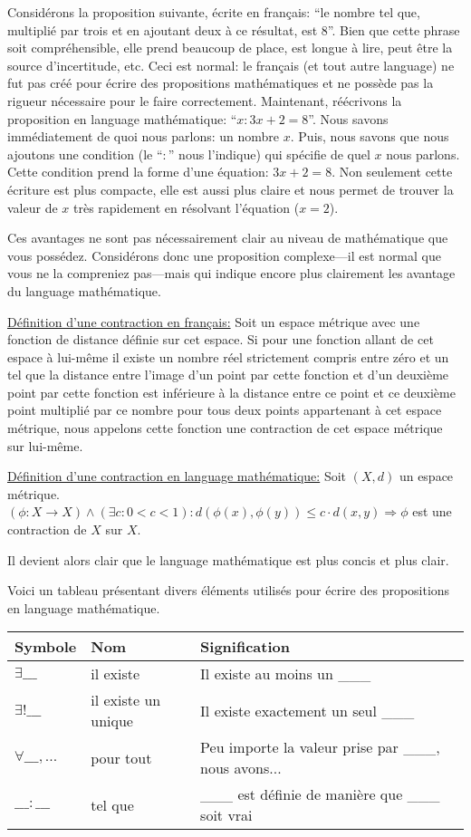 Considérons la proposition suivante, écrite en français: ``le nombre tel que, multiplié par trois et en ajoutant deux à ce résultat, est 8''. Bien que cette phrase soit compréhensible, elle prend beaucoup de place, est longue à lire, peut être la source d'incertitude, etc. Ceci est normal: le français (et tout autre language) ne fut pas créé pour écrire des propositions mathématiques et ne possède pas la rigueur nécessaire pour le faire correctement. Maintenant, réécrivons la proposition en language mathématique: ``$x : 3x+2 = 8$''. Nous savons immédiatement de quoi nous parlons: un nombre $x$. Puis, nous savons que nous ajoutons une condition (le ``$:$'' nous l'indique) qui spécifie de quel $x$ nous parlons. Cette condition prend la forme d'une équation: $3x+2 = 8$. Non seulement cette écriture est plus compacte, elle est aussi plus claire et nous permet de trouver la valeur de $x$ très rapidement en résolvant l'équation ($x = 2$).

\begin{exemple}
    Ces avantages ne sont pas nécessairement clair au niveau de mathématique que vous possédez. Considérons donc une proposition complexe---il est normal que vous ne la compreniez pas---mais qui indique encore plus clairement les avantage du language mathématique.

    \underline{Définition d'une contraction en français:} Soit un espace métrique avec une fonction de distance définie sur cet espace. Si pour une fonction allant de cet espace à lui-même il existe un nombre réel strictement compris entre zéro et un tel que la distance entre l'image d'un point par cette fonction et d'un deuxième point par cette fonction est inférieure à la distance entre ce point et ce deuxième point multiplié par ce nombre pour tous deux points appartenant à cet espace métrique, nous appelons cette fonction une contraction de cet espace métrique sur lui-même.

    \underline{Définition d'une contraction en language mathématique:} Soit $(X,d)$ un espace métrique. $(\phi \colon X \to X) \wedge (\exists c : 0<c<1) : d(\phi(x), \phi(y)) \leq c\cdot d(x,y) \Rightarrow \phi$ est une contraction de $X$ sur $X$.

    Il devient alors clair que le language mathématique est plus concis et plus clair.
\end{exemple}

Voici un tableau présentant divers éléments utilisés pour écrire des propositions en language mathématique.
\begin{longtable}{lll}
	\toprule
	\textbf{Symbole} & \textbf{Nom} & \textbf{Signification} \\ \midrule
	$\exists \_\_\_$ & il existe & Il existe au moins un \_\_\_ \\ \hline
	$\exists ! \_\_\_$ & il existe un unique & Il existe exactement un seul \_\_\_ \\ \hline
	$\forall \_\_\_, ...$ & pour tout & Peu importe la valeur prise par \_\_\_, nous avons... \\ \hline
	$\_\_\_ : \_\_\_$ & tel que & \_\_\_ est définie de manière que \_\_\_ soit vrai \\ \bottomrule
\end{longtable}


